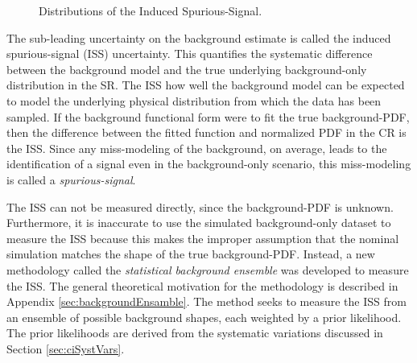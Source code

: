 \begin{figure}[h!]
\caption{Distributions of the Induced Spurious-Signal.}
\label{fig:ciBkgIssSyst}
\end{figure}


The sub-leading uncertainty on the background estimate is called the induced spurious-signal (ISS) uncertainty.
This quantifies the systematic difference between the background model and the true underlying background-only distribution in the SR.
The ISS how well the background model can be expected to model the underlying physical distribution from which the data has been sampled.
If the background functional form were to fit the true background-PDF, then the difference between the fitted function and normalized PDF in the CR is the ISS.
Since any miss-modeling of the background, on average, leads to the identification of a signal even in the background-only scenario, this miss-modeling is called a \emph{spurious-signal}.

The ISS can not be measured directly, since the background-PDF is unknown.
Furthermore, it is inaccurate to use the simulated background-only dataset to measure the ISS because this makes the improper assumption that the nominal simulation matches the shape of the true background-PDF.
Instead, a new methodology called the \emph{statistical background ensemble} was developed to measure the ISS.
The general theoretical motivation for the methodology is described in Appendix \ref{sec:backgroundEnsamble}.
The method seeks to measure the ISS from an ensemble of possible background shapes, each weighted by a prior likelihood.
The prior likelihoods are derived from the systematic variations discussed in Section \ref{sec:ciSystVars}.

